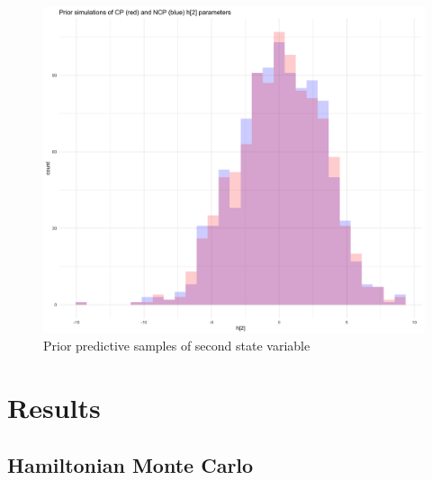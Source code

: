 \documentclass[12pt, a4paper]{article}
\begin{document}
        \begin{figure}[h]
            \centering
            \includegraphics[scale=0.1]{figures/ppc_h2.png}
            \caption{Prior predictive samples of second state variable}
        \end{figure}
        


\section{Results}

    \subsection{Hamiltonian Monte Carlo}
\end{document}
